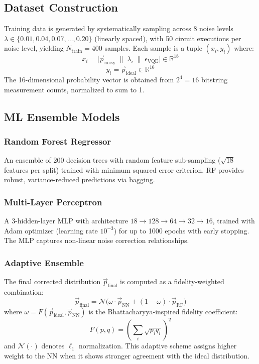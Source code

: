 \documentclass[journal]{IEEEtran}
\begin{document}
\subsection{Dataset Construction}

Training data is generated by systematically sampling across 8 noise levels $\lambda \in \{0.01, 0.04, 0.07, \ldots, 0.20\}$ (linearly spaced), with 50 circuit executions per noise level, yielding $N_{\text{train}} = 400$ samples. Each sample is a tuple $(x_i, y_i)$ where:
\begin{equation}
  x_i = \bigl[\vec{p}_{\text{noisy}} \;\|\; \lambda_i \;\|\; \epsilon_{\text{VQE}}\bigr] \in \mathbb{R}^{18}
\end{equation}
\begin{equation}
  y_i = \vec{p}_{\text{ideal}} \in \mathbb{R}^{16}
\end{equation}
The 16-dimensional probability vector is obtained from $2^4 = 16$ bitstring measurement counts, normalized to sum to 1.

\subsection{ML Ensemble Models}

\subsubsection{Random Forest Regressor}
An ensemble of 200 decision trees with random feature sub-sampling ($\sqrt{18}$ features per split) trained with minimum squared error criterion. RF provides robust, variance-reduced predictions via bagging.

\subsubsection{Multi-Layer Perceptron}
A 3-hidden-layer MLP with architecture $18 \to 128 \to 64 \to 32 \to 16$, trained with Adam optimizer (learning rate $10^{-3}$) for up to 1000 epochs with early stopping. The MLP captures non-linear noise correction relationships.

\subsubsection{Adaptive Ensemble}
The final corrected distribution $\vec{p}_{\text{final}}$ is computed as a fidelity-weighted combination:
\begin{equation}
  \vec{p}_{\text{final}} = \mathcal{N}\!\bigl(\omega \cdot \vec{p}_{\text{NN}} + (1-\omega) \cdot \vec{p}_{\text{RF}}\bigr)
\end{equation}
where $\omega = F(\vec{p}_{\text{ideal}}, \vec{p}_{\text{NN}})$ is the Bhattacharyya-inspired fidelity coefficient:
\begin{equation}
  F(p, q) = \left(\sum_i \sqrt{p_i q_i}\right)^2
\end{equation}
and $\mathcal{N}(\cdot)$ denotes $\ell_1$ normalization. This adaptive scheme assigns higher weight to the NN when it shows stronger agreement with the ideal distribution.
\end{document}
